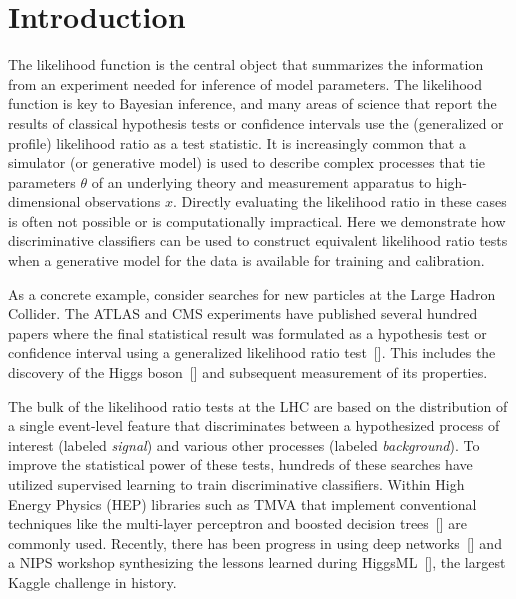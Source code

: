 \documentclass[aoas,preprint]{imsart}
\newcommand{\citek}[1]{[\cite{#1}]}
\numberwithin{equation}{section}
\theoremstyle{plain}
\begin{document}
\section{Introduction}

The likelihood function is the central object that summarizes the information from an experiment needed for inference of model parameters. The likelihood function is key to Bayesian inference, and many areas of science that report the results of classical hypothesis tests or confidence intervals use the (generalized or profile) likelihood ratio as a test statistic.
It is increasingly common that a simulator (or generative model) is used to describe complex processes that tie 
parameters $\theta$ of an underlying theory and measurement apparatus to high-dimensional observations $x$. 
Directly evaluating the likelihood ratio in these cases is often not possible or is computationally impractical. Here we demonstrate how discriminative classifiers can be used to construct equivalent likelihood ratio tests when 
a generative model for the data is available for training and calibration.  

As a concrete example, consider searches for new particles at the Large Hadron Collider. 
The ATLAS and CMS experiments have published several hundred papers where the 
final statistical result was formulated as a hypothesis test or confidence interval 
using a generalized  likelihood ratio test~\citek{Cowan:2010js}. This includes
the discovery of the Higgs boson~\citek{Aad:2012tfa,Chatrchyan:2012ufa} and 
subsequent measurement of its properties.  

The bulk of the likelihood ratio tests at the LHC are based on the distribution of a single event-level feature
that discriminates between a hypothesized process of interest (labeled \textit{signal}) and various other processes 
(labeled \textit{background}). To improve the statistical power of these tests, hundreds of these searches have utilized supervised learning to train discriminative classifiers. Within High Energy Physics (HEP) libraries such as TMVA that implement conventional techniques like the multi-layer perceptron and boosted decision trees~\citek{Hocker:2007ht} are commonly used. Recently, there has been progress in using deep networks~\citek{Baldi:2014kfa} and a NIPS workshop synthesizing the lessons learned during HiggsML~\citek{HepML}, the largest Kaggle challenge in history. 
\end{document}
